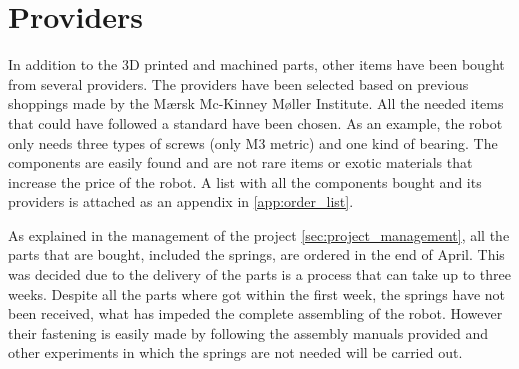 \section{Providers} %
\label{sec:providers}
In addition to the 3D printed and machined parts, other items have been bought from several providers.
The providers have been selected based on previous shoppings made by the Mærsk Mc-Kinney Møller Institute.
All the needed items that could have followed a standard have been chosen. 
As an example, the robot only needs three types of screws (only M3 metric) and one kind of bearing.
The components are easily found and are not rare items or exotic materials that increase the price of the robot.
A list with all the components bought and its providers is attached as an appendix in \ref{app:order_list}.

As explained in the management of the project \ref{sec:project_management}, all the parts that are bought, included the springs, are ordered in the end of April. 
This was decided due to the delivery of the parts is a process that can take up to three weeks.
Despite all the parts where got within the first week, the springs have not been received, what has impeded the complete assembling of the robot.
However their fastening is easily made by following the assembly manuals provided and other experiments in which the springs are not needed will be carried out.


